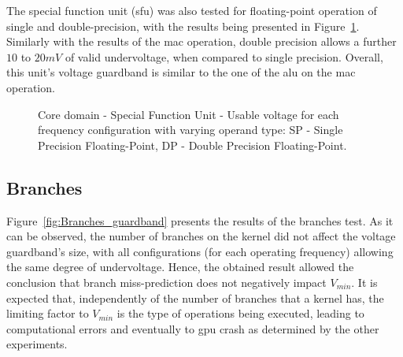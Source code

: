 The special function unit (\acrshort{sfu}) was also tested for floating-point operation of single and double-precision, with the results being presented in Figure~\ref{fig:SFU_guardband}. Similarly with the results of the \acrshort{mac} operation, double precision allows a further $10$ to $20mV$ of valid undervoltage, when  compared to single precision. Overall, this unit's voltage guardband is similar to the one of the \acrshort{alu} on the \acrshort{mac} operation. 



\begin{figure}[!htb]
    \centering
    \begin{subfigmatrix}{2}
      \label{fig:SFU_guardband}
    \end{subfigmatrix}
    \caption{Core domain - Special Function Unit - Usable voltage for each frequency configuration with varying operand type: SP - Single Precision Floating-Point, DP - Double Precision Floating-Point.}
\end{figure}

\subsection{Branches}

Figure~\ref{fig:Branches_guardband} presents the results of the branches test. As it can be observed, the number of branches on the kernel did not affect the voltage guardband's size, with all configurations (for each operating frequency) allowing the same degree of undervoltage.
Hence, the obtained result allowed the conclusion that branch miss-prediction does not negatively impact $V_{min}$. It is expected that, independently of the number of branches that a kernel has, the limiting factor to $V_{min}$ is the type of operations being executed, leading to computational errors and eventually to \acrshort{gpu} crash as determined by the other experiments.

